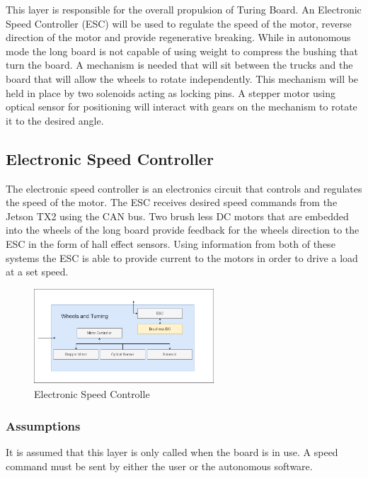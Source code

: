 This layer is responsible for the overall propulsion of Turing Board. An Electronic Speed Controller (ESC) will be used to regulate the speed of the motor, reverse direction of the motor and provide regenerative breaking. While in autonomous mode the long board is not capable of using weight to compress the bushing that turn the board. A mechanism is needed that will sit between the trucks and the board that will allow the wheels to rotate independently. This mechanism will be held in place by two solenoids acting as locking pins. A stepper motor using optical sensor for positioning will interact with gears on the mechanism to rotate it to the desired angle.






\subsection{Electronic Speed Controller}
The electronic speed controller is an electronics circuit that controls and regulates the speed of the motor. The ESC receives desired speed commands from the Jetson TX2 using the CAN bus. Two brush less DC motors that are embedded into the wheels of the long board provide feedback for the wheels direction to the ESC in the form of hall effect sensors. Using information from both of these systems the ESC is able to provide current to the motors in order to drive a load at a set speed.


\begin{figure}[h!]
	\centering
 	\includegraphics[width=0.60\textwidth]{ADS Latex/images/ESC.png}
 \caption{Electronic Speed Controlle}
\end{figure}

\subsubsection{Assumptions}
It is assumed that this layer is only called when the board is in use. A speed command must be sent by either the user or the autonomous software.

